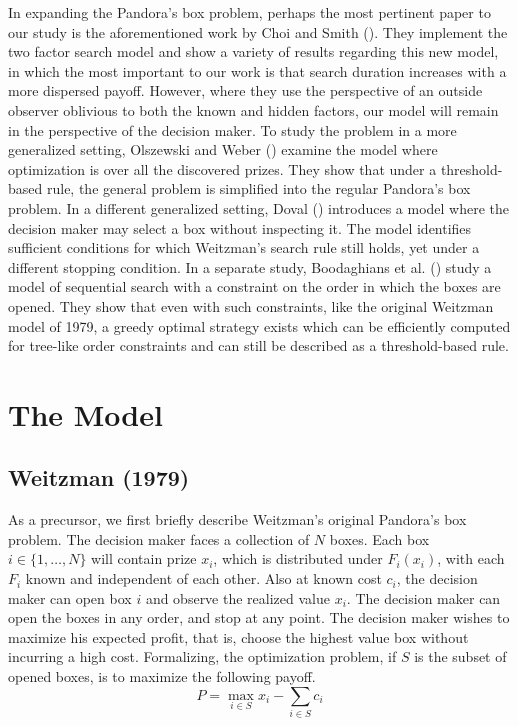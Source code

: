 \documentclass[12pt]{article}
\begin{document}
In expanding the Pandora's box problem, perhaps the most pertinent paper to our study is the aforementioned work by Choi and Smith (\citeyear{Choi}). They implement the two factor search model and show a variety of results regarding this new model, in which the most important to our work is that search duration increases with a more dispersed payoff. However, where they use the perspective of an outside observer oblivious to both the known and hidden factors, our model will remain in the perspective of the decision maker. To study the problem in a more generalized setting, Olszewski and Weber (\citeyear{olszewski}) examine the model where optimization is over all the discovered prizes. They show that under a threshold-based rule, the general problem is simplified into the regular Pandora's box problem. In a different generalized setting, Doval (\citeyear{doval}) introduces a model where the decision maker may select a box without inspecting it. The model identifies sufficient conditions for which Weitzman's search rule still holds, yet under a different stopping condition. In a separate study, Boodaghians et al. (\citeyear{Boodaghians}) study a model of sequential search with a constraint on the order in which the boxes are opened. They show that even with such constraints, like the original Weitzman model of 1979, a greedy optimal strategy exists which can be efficiently computed for tree-like order constraints and can still be described as a threshold-based rule.

\section{The Model}
\subsection{Weitzman (1979)}
As a precursor, we first briefly describe Weitzman's original Pandora's box problem. The decision maker faces a collection of \(N\) boxes. Each box \(i\in\{1,\dots, N\}\) will contain prize \(x_i\), which is distributed under \(F_i(x_i)\), with each \(F_i\) known and independent of each other. Also at known cost \(c_i\), the decision maker can open box \(i\) and observe the realized value \(x_i\). The decision maker can open the boxes in any order, and stop at any point. The decision maker wishes to maximize his expected profit, that is, choose the highest value box without incurring a high cost. Formalizing, the optimization problem, if \(S\) is the subset of opened boxes, is to maximize the following payoff.
\begin{equation}
    P=\max_{i\in S}x_i-\sum_{i\in S}c_i
\end{equation}
\end{document}

